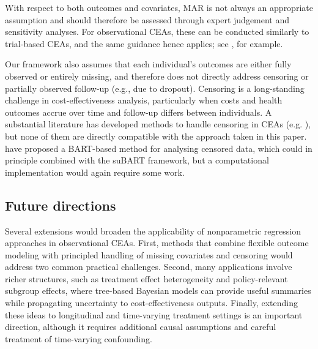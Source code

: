 \documentclass[aoas,preprint]{imsart}
\theoremstyle{plain}
\theoremstyle{definition}
\theoremstyle{remark}
\theoremstyle{remark}
\begin{document}
With respect to both outcomes and covariates, MAR is not always an appropriate assumption and should therefore be assessed through expert judgement and sensitivity analyses. For observational CEAs, these can be conducted similarly to trial-based CEAs, and the same guidance hence applies; see \citet{faria2014guide,mason2018bayesian}, for example.

Our framework also assumes that each individual's outcomes are either fully observed or entirely missing, and therefore does not directly address censoring or partially observed follow-up (e.g., due to dropout). Censoring is a long-standing challenge in cost-effectiveness analysis, particularly when costs and health outcomes accrue over time and follow-up differs between individuals. A substantial literature has developed methods to handle censoring in CEAs (e.g. \citet{lin1997estimating,bang2000estimating,willan2006statistical}), but none of them are directly compatible with the approach taken in this paper.  
\citet{sparapani2016nonparametric} have proposed a BART-based method for analysing censored data, which could in principle combined with the suBART framework, but a computational implementation would again require some work.

\subsection{Future directions}
Several extensions would broaden the applicability of nonparametric regression approaches in observational CEAs. First, methods that combine flexible outcome modeling with principled handling of missing covariates and censoring would address two common practical challenges. Second, many applications involve richer structures, such as treatment effect heterogeneity and policy-relevant subgroup effects, where tree-based Bayesian models can provide useful summaries while propagating uncertainty to cost-effectiveness outputs. Finally, extending these ideas to longitudinal and time-varying treatment settings is an important direction, although it requires additional causal assumptions and careful treatment of time-varying confounding.



{}


\end{document}
